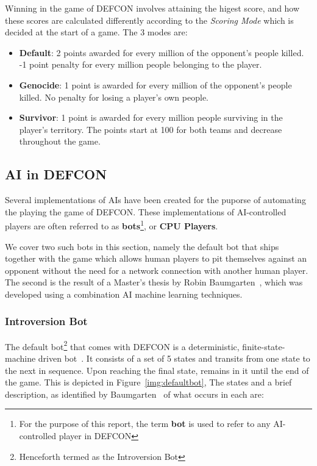         Winning in the game of DEFCON involves attaining the higest score, and how these scores are calculated differently according to the \emph{Scoring Mode} which is decided at the start of a game. The 3 modes are:

         \begin{itemize}
         \item \textbf{Default}: 2 points awarded for every million of the opponent's people killed. -1 point penalty for every million people belonging to the player.
         \item \textbf{Genocide}: 1 point is awarded for every million of the opponent's people killed. No penalty for losing a player's own people.
         \item \textbf{Survivor}: 1 point is awarded for every million people surviving in the player's territory. The points start at 100 for both teams and decrease throughout the game.
         \end{itemize}    
        
        \pagebreak
        
        \subsection{AI in DEFCON}
        \label{sec:defcon-bots}
        Several implementations of AIs have been created for the puporse of automating the playing the game of DEFCON. These implementations of AI-controlled players are often referred to as \textbf{bots}\footnote{For the purpose of this report, the term \textbf{bot} is used to refer to any AI-controlled player in DEFCON}, or \textbf{CPU Players}.
        
        We cover two such bots in this section, namely the default bot that ships together with the game which allows human players to pit themselves against an opponent without the need for a network connection with another human player. The second is the result of a Master's thesis by Robin Baumgarten~\cite{robbot}, which was developed using a combination AI machine learning techniques.
        
        \subsubsection{Introversion Bot}
        The default bot\footnote{Henceforth termed as the Introversion Bot} that comes with DEFCON is a deterministic, finite-state-machine driven bot~\cite{robbot}. It consists of a set of 5 states and transits from one state to the next in sequence. Upon reaching the final state, remains in it until the end of the game. This is depicted in Figure~\ref{img:defaultbot}, The states and a brief description, as identified by Baumgarten~\cite{robbot} of what occurs in each are:
        
